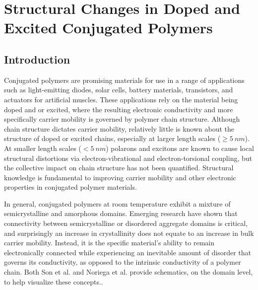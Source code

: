 \chapter{Structural Changes in Doped and Excited Conjugated Polymers}

\section{Introduction}

Conjugated polymers are promising materials for use in a range of applications such as light-emitting diodes, solar cells, battery materials, transistors, and actuators for artificial muscles.\cite{Swager2017} These applications rely on the material being doped and or excited, where the resulting electronic conductivity and more specifically carrier mobility is governed by polymer chain structure.\cite{Noriega2013a, Noriega2013} Although chain structure dictates carrier mobility, relatively little is known about the structure of doped or excited chains, especially at larger length scales ($\geq 5 \ nm$). At smaller length scales ($< 5 \ nm$) polarons and excitons are known to cause local structural distortions via electron-vibrational and electron-torsional coupling,\cite{Tapping2014, Zhou2015, Yu2012, Busby2011} but the collective impact on chain structure has not been quantified. Structural knowledge is fundamental to improving carrier mobility and other electronic properties in conjugated polymer materials.\cite{Beaujuge2011, Kuei2017}

In general, conjugated polymers at room temperature exhibit a mixture of semicrystalline and amorphous domains.\cite{Shen2016} Emerging research have shown that connectivity between semicrystalline or disordered aggregate domains is critical, and surprisingly an increase in crystallinity does not equate to an increase in bulk carrier mobility.\cite{Son2016, Noriega2013} Instead, it is the specific material's ability to remain electronically connected while experiencing an inevitable amount of disorder that governs its conductivity,\cite{Noriega2013} as opposed to the intrinsic conductivity of a polymer chain. Both Son et al. and Noriega et al. provide schematics, on the domain level, to help visualize these concepts.\cite{Son2016, Noriega2013}.

